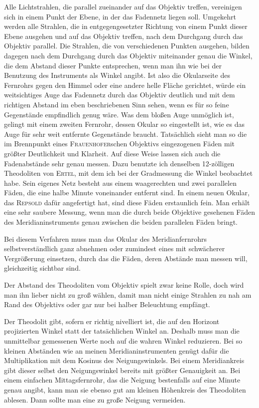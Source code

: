 Alle Lichtstrahlen, die parallel zueinander auf das Objektiv treffen, vereinigen sich in einem Punkt der Ebene, in der das Fadennetz liegen soll. Umgekehrt werden alle Strahlen, die in entgegengesetzter Richtung von einem Punkt dieser Ebene ausgehen und auf das Objektiv treffen, nach dem Durchgang durch das Objektiv parallel. Die Strahlen, die von verschiedenen Punkten ausgehen, bilden dagegen nach dem Durchgang durch das Objektiv miteinander genau die Winkel, die dem Abstand dieser Punkte entsprechen, wenn man ihn wie bei der Benutzung des Instruments als Winkel angibt. Ist also die Okularseite des Fernrohrs gegen den Himmel oder eine andere helle Fläche gerichtet, würde ein weitsichtiges Auge das Fadennetz durch das Objektiv deutlich und mit dem richtigen Abstand im eben beschriebenen Sinn sehen, wenn es für so feine Gegenstände empfindlich genug wäre. Was dem bloßen Auge unmöglich ist, gelingt mit einem zweiten Fernrohr, dessen Okular so eingestellt ist, wie es das Auge für sehr weit entfernte Gegenstände braucht. Tatsächlich sieht man so die im Brennpunkt eines \textsc{Frauenhofer}schen Objektivs eingezogenen Fäden mit größter Deutlichkeit und Klarheit.
Auf diese Weise lassen sich auch die Fadenabstände sehr genau messen. Dazu benutzte ich denselben 12-zölligen Theodoliten von \textsc{Ertel}, mit dem ich bei der Gradmessung die Winkel beobachtet habe. Sein eigenes Netz besteht aus einem waagerechten und zwei parallelen Fäden, die eine halbe Minute voneinander entfernt sind. In einem neuen Okular, das \textsc{Repsold} dafür angefertigt hat, sind diese Fäden erstaunlich fein. Man erhält eine sehr saubere Messung, wenn man die durch beide Objektive gesehenen Fäden des Meridianinstruments genau zwischen die beiden parallelen Fäden bringt.

Bei diesem Verfahren muss man das Okular des Meridianfernrohrs selbstverständlich ganz abnehmen oder zumindest eines mit schwächerer Vergrößerung einsetzen, durch das die Fäden, deren Abstände man messen will, gleichzeitig sichtbar sind.

Der Abstand des Theodoliten vom Objektiv spielt zwar keine Rolle, doch wird man ihn lieber nicht zu groß wählen, damit man nicht einige Strahlen zu nah am Rand des Objektivs oder gar nur bei halber Beleuchtung empfängt.

%
Der Theodolit gibt, sofern er richtig nivelliert ist, die auf den Horizont projizierten Winkel statt der tatsächlichen Winkel an. Deshalb muss man die unmittelbar gemessenen Werte noch auf die wahren Winkel reduzieren. Bei so kleinen Abständen wie an meinen Meridianinstrumenten genügt dafür die Multiplikation mit dem Kosinus des Neigungswinkels. Bei einem Meridiankreis gibt dieser selbst den Neigungswinkel bereits mit größter Genauigkeit an. Bei einem einfachen Mittagsfernrohr, das die Neigung bestenfalls auf eine Minute genau angibt, kann man sie ebenso gut am kleinen Höhenkreis des Theodoliten ablesen. Dann sollte man eine zu große Neigung vermeiden.

